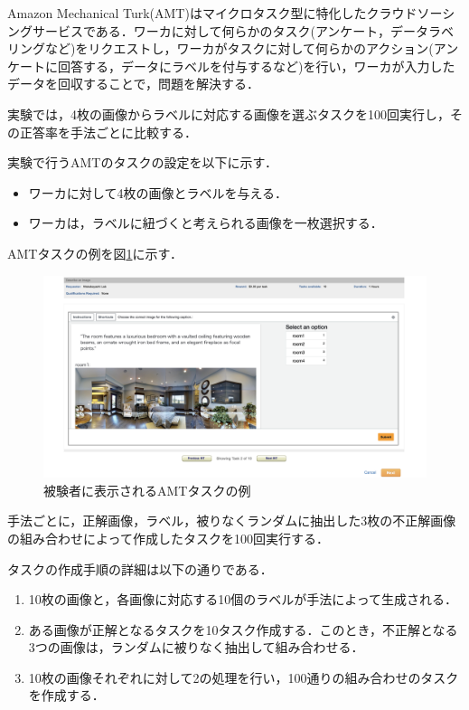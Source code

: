 \documentclass[a4paper,11pt]{jreport}
\begin{document}
Amazon Mechanical Turk(AMT)はマイクロタスク型に特化したクラウドソーシングサービスである．ワーカに対して何らかのタスク(アンケート，データラベリングなど)をリクエストし，ワーカがタスクに対して何らかのアクション(アンケートに回答する，データにラベルを付与するなど)を行い，ワーカが入力したデータを回収することで，問題を解決する．

実験では，4枚の画像からラベルに対応する画像を選ぶタスクを100回実行し，その正答率を手法ごとに比較する．

実験で行うAMTのタスクの設定を以下に示す．

\begin{itemize}
  \item ワーカに対して4枚の画像とラベルを与える．
  \item ワーカは，ラベルに紐づくと考えられる画像を一枚選択する．
\end{itemize}

AMTタスクの例を図\ref{fig:amt_example}に示す．

\begin{figure}[H]
  \centering
  \includegraphics[width=\linewidth]{figures/amt.png}
  \caption{被験者に表示されるAMTタスクの例}
  \label{fig:amt_example}
\end{figure}

手法ごとに，正解画像，ラベル，被りなくランダムに抽出した3枚の不正解画像の組み合わせによって作成したタスクを100回実行する．

タスクの作成手順の詳細は以下の通りである．
\begin{enumerate}
  \item 10枚の画像と，各画像に対応する10個のラベルが手法によって生成される．
  \item ある画像が正解となるタスクを10タスク作成する．このとき，不正解となる3つの画像は，ランダムに被りなく抽出して組み合わせる．
  \item 10枚の画像それぞれに対して2の処理を行い，100通りの組み合わせのタスクを作成する．
\end{enumerate}
\end{document}
